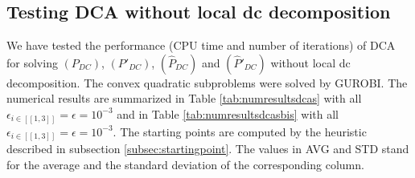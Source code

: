 \documentclass[3p]{elsarticle}
\newcommand{\IntEnt}[1]{\left[\!\left[#1\right]\!\right]}
\begin{document}
\subsection{Testing DCA without local dc decomposition}
We have tested the performance (CPU time and number of iterations) of DCA for solving $(P_{DC})$, $(P'_{DC})$, $(\hat{P}_{DC})$ and $(\hat{P}'_{DC})$ without local dc decomposition. The convex quadratic subproblems were solved by GUROBI. The numerical results are summarized in Table \ref{tab:numresultsdcas} with all $\epsilon_{i\in \IntEnt{1,3}}=\epsilon=10^{-3}$ and in Table \ref{tab:numresultsdcasbis} with all $\epsilon_{i\in \IntEnt{1,3}}=\epsilon=10^{-3}$. The starting points are computed by the heuristic described in subsection \ref{subsec:startingpoint}. The values in AVG and STD stand for the average and the standard deviation of the corresponding column. 
\end{document}
